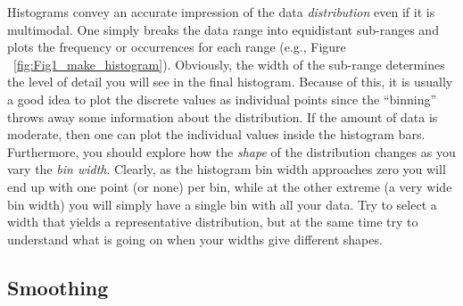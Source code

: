 	Histograms convey an accurate impression of the data \emph{distribution} even if it is multimodal.  
One simply breaks the data range into equidistant sub-ranges and plots the frequency or occurrences for each range (e.g., Figure ~\ref{fig:Fig1_make_histogram}).  
Obviously, the width of the sub-range determines the level of detail you will see in the final 
histogram.  Because of this, it is usually a good idea to plot the discrete values as individual 
points since the ``binning'' throws away some information about the distribution.  If the amount 
of data is moderate, then one can plot the individual values inside the histogram bars.  Furthermore,
you should explore how the \emph{shape} of the distribution changes as you vary the \emph{bin width}.
Clearly, as the histogram bin width approaches zero you will end up with one point (or none) per bin, while at the
other extreme (a very wide bin width) you will simply have a single bin with all your data.
Try to select a width that yields a representative distribution, but at the same time try to understand
what is going on when your widths give different shapes.

\subsection{Smoothing}

